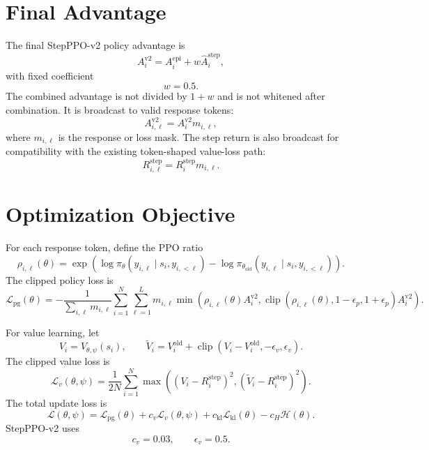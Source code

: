 \documentclass[10pt]{article}
\newcommand{\clip}{\operatorname{clip}}
\begin{document}
\section{Final Advantage}
The final StepPPO-v2 policy advantage is
\begin{equation}
A_i^{\mathrm{v2}}=A_i^{\mathrm{epi}}+w\widehat A_i^{\mathrm{step}},
\end{equation}
with fixed coefficient
\begin{equation}
w=0.5.
\end{equation}
The combined advantage is not divided by $1+w$ and is not whitened after combination. It is broadcast to valid response tokens:
\begin{equation}
A_{i,\ell}^{\mathrm{v2}}=A_i^{\mathrm{v2}}m_{i,\ell},
\end{equation}
where $m_{i,\ell}$ is the response or loss mask. The step return is also broadcast for compatibility with the existing token-shaped value-loss path:
\begin{equation}
R_{i,\ell}^{\mathrm{step}}=R_i^{\mathrm{step}}m_{i,\ell}.
\end{equation}

\section{Optimization Objective}
For each response token, define the PPO ratio
\begin{equation}
\rho_{i,\ell}(\theta)=
\exp\left(
\log\pi_\theta(y_{i,\ell}\mid s_i,y_{i,<\ell})
-
\log\pi_{\theta_{\mathrm{old}}}(y_{i,\ell}\mid s_i,y_{i,<\ell})
\right).
\end{equation}
The clipped policy loss is
\begin{equation}
\mathcal L_{\mathrm{pg}}(\theta)
=-\frac{1}{\sum_{i,\ell}m_{i,\ell}}
\sum_{i=1}^{N}\sum_{\ell=1}^{L}
m_{i,\ell}
\min\left(
\rho_{i,\ell}(\theta)A_i^{\mathrm{v2}},
\clip(\rho_{i,\ell}(\theta),1-\epsilon_p,1+\epsilon_p)A_i^{\mathrm{v2}}
\right).
\end{equation}

For value learning, let
\begin{equation}
V_i=V_{\theta,\psi}(s_i),
\qquad
\widetilde V_i=V_i^{\mathrm{old}}+
\clip(V_i-V_i^{\mathrm{old}},-\epsilon_v,\epsilon_v).
\end{equation}
The clipped value loss is
\begin{equation}
\mathcal L_v(\theta,\psi)
=
\frac{1}{2N}\sum_{i=1}^{N}
\max\left(
(V_i-R_i^{\mathrm{step}})^2,
(\widetilde V_i-R_i^{\mathrm{step}})^2
\right).
\end{equation}
The total update loss is
\begin{equation}
\mathcal L(\theta,
\psi)=
\mathcal L_{\mathrm{pg}}(\theta)
+c_v\mathcal L_v(\theta,\psi)
+c_{\mathrm{kl}}\mathcal L_{\mathrm{kl}}(\theta)
-c_H\mathcal H(\theta).
\end{equation}
StepPPO-v2 uses
\begin{equation}
c_v=0.03,
\qquad
\epsilon_v=0.5.
\end{equation}
\end{document}

